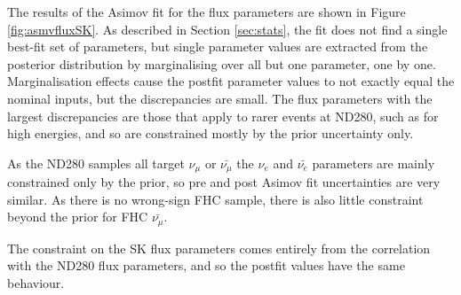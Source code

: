The results of the Asimov fit for the flux parameters are shown in Figure \ref{fig:asmvfluxSK}. As described in Section \ref{sec:stats}, the fit does not find a single best-fit set of parameters, but single parameter values are extracted from the posterior distribution by marginalising over all but one parameter, one by one. Marginalisation effects cause the postfit parameter values to not exactly equal the nominal inputs, but the discrepancies are small. The flux parameters with the largest discrepancies are those that apply to rarer events at ND280, such as for high energies, and so are constrained mostly by the prior uncertainty only.

As the ND280 samples all target $\nu_{\mu}$ or $\bar{\nu_{\mu}}$ the $\nu_e$ and $\bar{\nu_e}$ parameters are mainly constrained only by the prior, so pre and post Asimov fit uncertainties are very similar. As there is no wrong-sign FHC sample, there is also little constraint beyond the prior for FHC $\bar{\nu_{\mu}}$. 

The constraint on the SK flux parameters comes entirely from the correlation with the ND280 flux parameters, and so the postfit values have the same behaviour.

